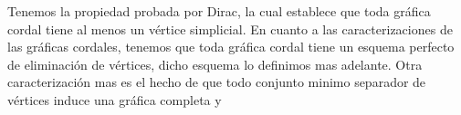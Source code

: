 Tenemos la propiedad probada por Dirac, la cual establece que toda gráfica
cordal tiene al menos un vértice simplicial. En cuanto a las caracterizaciones
de las gráficas cordales, tenemos que toda gráfica cordal tiene un esquema
perfecto de eliminación de vértices, dicho esquema lo definimos mas adelante.
Otra caracterización mas es el hecho de que todo conjunto minimo separador de
vértices induce una gráfica completa y 

